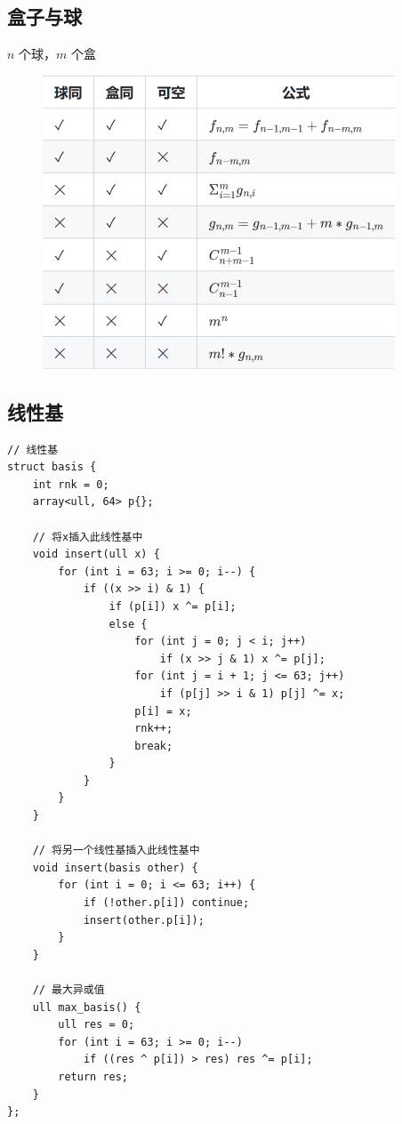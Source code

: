 \documentclass[UTF8]{ctexart}
\begin{document}
\begin{sloppypar}
\subsection{盒子与球}

$n$ 个球，$m$ 个盒

\begin{figure}[H]
    \flushleft
    \includegraphics[]{box-and-ball.png}
    \label{fig:left}
\end{figure}

\subsection{线性基}

\begin{lstlisting}[style=cpp]
// 线性基
struct basis {
    int rnk = 0;
    array<ull, 64> p{};

    // 将x插入此线性基中
    void insert(ull x) {
        for (int i = 63; i >= 0; i--) {
            if ((x >> i) & 1) {
                if (p[i]) x ^= p[i];
                else {
                    for (int j = 0; j < i; j++)
                        if (x >> j & 1) x ^= p[j];
                    for (int j = i + 1; j <= 63; j++)
                        if (p[j] >> i & 1) p[j] ^= x;
                    p[i] = x;
                    rnk++;
                    break;
                }
            }
        }
    }

    // 将另一个线性基插入此线性基中
    void insert(basis other) {
        for (int i = 0; i <= 63; i++) {
            if (!other.p[i]) continue;
            insert(other.p[i]);
        }
    }

    // 最大异或值
    ull max_basis() {
        ull res = 0;
        for (int i = 63; i >= 0; i--)
            if ((res ^ p[i]) > res) res ^= p[i];
        return res;
    }
};
\end{lstlisting}


\end{sloppypar}
\end{document}
